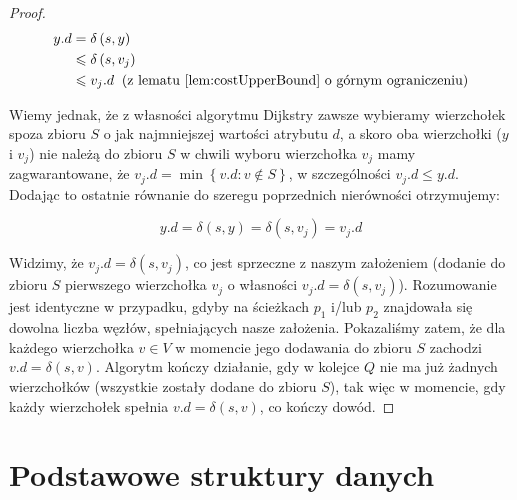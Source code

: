 \begin{proof}
\begin{equation}
\begin{aligned}
y.d &= \delta \left( s, y \right) \\
&\leqslant \delta \left( s, v_{j} \right) \\
&\leqslant v_{j}.d \; \; \textrm{(z lematu \ref{lem:costUpperBound} o górnym ograniczeniu)}
\end{aligned}
\end{equation}

Wiemy jednak, że z własności algorytmu Dijkstry zawsze wybieramy wierzchołek spoza zbioru $S$ o jak najmniejszej wartości atrybutu $d$, a skoro oba wierzchołki ($y$ i $v_{j}$) nie należą do zbioru $S$ w chwili wyboru wierzchołka $v_{j}$ mamy zagwarantowane, że $v_{j}.d = \min \left\{ v.d : v \notin S \right\}$, w szczególności $v_{j}.d \leqslant y.d$. Dodając to ostatnie równanie do szeregu poprzednich nierówności otrzymujemy:

\begin{equation}
y.d = \delta \left( s, y \right) = \delta \left( s, v_{j} \right) = v_{j}.d
\end{equation}

Widzimy, że $ v_{j}.d = \delta \left( s, v_{j} \right) $, co jest sprzeczne z naszym założeniem (dodanie do zbioru $S$ pierwszego wierzchołka $v_{j}$ o własności  $v_{j}.d = \delta \left( s, v_{j} \right) $). Rozumowanie jest identyczne w przypadku, gdyby na ścieżkach $p_{1}$ i/lub $p_{2}$ znajdowała się dowolna liczba węzłów, spełniających nasze założenia. Pokazaliśmy zatem, że dla każdego wierzchołka $v \in V$ w momencie jego dodawania do zbioru $S$ zachodzi $v.d = \delta \left( s, v \right)$. Algorytm kończy działanie, gdy w kolejce $Q$ nie ma już żadnych wierzchołków (wszystkie zostały dodane do zbioru $S$), tak więc w momencie, gdy każdy wierzchołek spełnia $v.d = \delta \left( s, v \right)$, co kończy dowód.
\end{proof}

\section{Podstawowe struktury danych}

